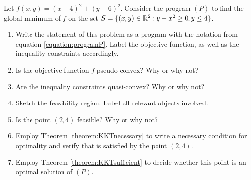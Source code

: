 
\begin{problem}[Basic]\cite[lec6\_constr\_opt, 10]{Freund2004nonlinear}
Let $f(x,y)=(x-4)^2+(y-6)^2$.  Consider the program $(P)$ to find the global minimum of $f$ on the set $S = \{ (x,y) \in \mathbb{R}^2 : y-x^2\geq 0, y\leq 4 \}$.
\begin{enumerate}
	\item Write the statement of this problem as a program with the notation from equation \ref{equation:programP}.  Label the objective function, as well as the inequality constraints accordingly.
	\item Is the objective function $f$ pseudo-convex? Why or why not?
	\item Are the inequality constraints quasi-convex?  Why or why not?
	\item Sketch the feasibility region.  Label all relevant objects involved.
	\item Is the point $(2,4)$ feasible?  Why or why not?
	\item Employ Theorem \ref{theorem:KKTnecessary} to write a necessary condition for optimality and verify that is satisfied by the point $(2,4)$.
	\item Employ Theorem \ref{theorem:KKTsufficient} to decide whether this point is an optimal solution of $(P)$.
\end{enumerate}
\end{problem}

